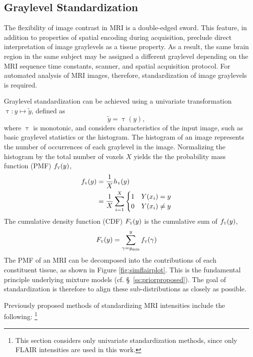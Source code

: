 \subsection{Graylevel Standardization}\label{ss:meth-ystd}
The flexibility of image contrast in MRI is a double-edged sword.
This feature, in addition to properties of spatial encoding during acquisition, preclude direct interpretation of image graylevels as a tissue property.
As a result, the same brain region in the same subject may be assigned a different graylevel depending on the MRI sequence time constants, scanner, and spatial acquisition protocol.
For automated analysis of MRI images, therefore, standardization of image graylevels is required.
\par
Graylevel standardization can be achieved using a univariate transformation $\uptau:y\mapsto\tilde{y}$, defined as
\begin{equation}
\tilde{y} = \uptau(y),
\end{equation}
where $\uptau$ is monotonic, and considers characteristics of the input image, such as basic graylevel statistics or the histogram.
The histogram of an image represents the number of occurrences of each graylevel in the image.
Normalizing the histogram by the total number of voxels $X$ yields the the probability mass function (PMF) $f_{\textsc{y}}(y)$,
\begin{align}
f_{\textsc{y}}(y) &= \frac{1}{X}h_{\textsc{y}}(y)\nonumber\\
&= \frac{1}{X}\sum_{i=1}^{X}
\begin{cases}
1&Y(x_i) = y\\
0&Y(x_i) \ne y\\
\end{cases}
\end{align}
The cumulative density function (CDF) $F_{\textsc{y}}(y)$ is the cumulative sum of $f_{\textsc{y}}(y)$,
\begin{equation}
F_{\textsc{y}}(y) = \sum_{\gamma=y_{\min}}^{y} f_{\textsc{y}}(\gamma)
\end{equation}
The PMF of an MRI can be decomposed into the contributions of each constituent tissue, as shown in Figure \ref{fig:simflairplot}.
This is the fundamental principle underlying mixture models (cf. \S\ \ref{ss:priorproposed}).
The goal of standardization is therefore to align these sub-distributions as closely as possible.
\par
Previously proposed methods of standardizing MRI intensities include the following:%
\footnote{This section considers only univariate standardization methods, since only FLAIR intensities are used in this work.}
